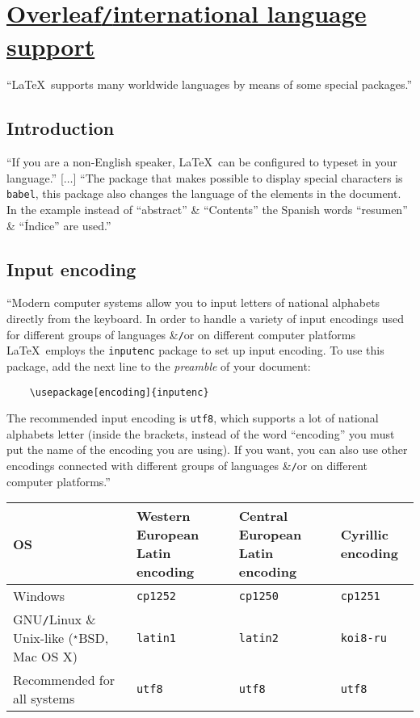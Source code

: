 \documentclass{article}
\numberwithin{equation}{section}
\begin{document}

\section{\href{https://www.overleaf.com/learn/latex/International_language_support}{Overleaf\texttt{/}international language support}}
``\LaTeX\ supports many worldwide languages by means of some special packages.''

\subsection{Introduction}
``If you are a non-English speaker, \LaTeX\ can be configured to typeset in your language.'' [$\ldots$] ``The package that makes possible to display special characters is \texttt{babel}, this package also changes the language of the elements in the document. In the example instead of ``abstract'' \& ``Contents'' the Spanish words ``resumen'' \& ``\'Indice'' are used.''

\subsection{Input encoding}
``Modern computer systems allow you to input letters of national alphabets directly from the keyboard. In order to handle a variety of input encodings used for different groups of languages \&\texttt{/}or on different computer platforms \LaTeX\ employs the \texttt{inputenc} package to set up input encoding. To use this package, add the next line to the \textit{preamble} of your document:
\begin{verbatim}
	\usepackage[encoding]{inputenc}
\end{verbatim}
The recommended input encoding is \texttt{utf8}, which supports a lot of national alphabets letter (inside the brackets, instead of the word ``encoding'' you must put the name of the encoding you are using). If you want, you can also use other encodings connected with different groups of languages \&\texttt{/}or on different computer platforms.''

\begin{table}[H]
	\centering
	\begin{tabular}{|p{5cm}|p{35mm}|p{35mm}|l|}
		\hline
		\textbf{OS} & \textbf{Western European Latin encoding} & \textbf{Central European Latin encoding} & \textbf{Cyrillic encoding} \\
		\hline
		Windows & \texttt{cp1252} & \texttt{cp1250} & \texttt{cp1251} \\
		\hline
		GNU\texttt{/}Linux \& Unix-like (${}^\star$BSD, Mac OS X) & \texttt{latin1} & \texttt{latin2} & \texttt{koi8-ru} \\
		\hline
		Recommended for all systems & \texttt{utf8} & \texttt{utf8} & \texttt{utf8} \\
		\hline
	\end{tabular}
\end{table}
\end{document}
